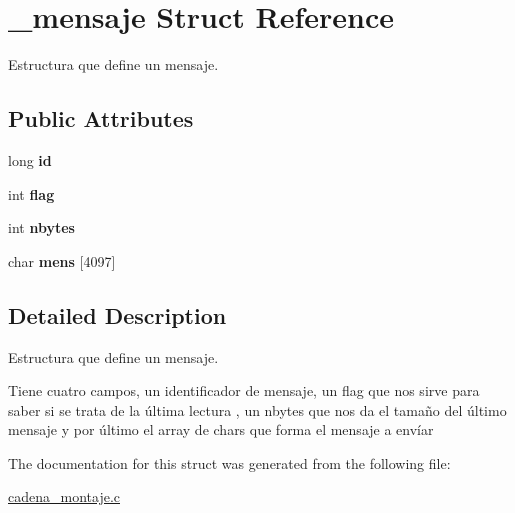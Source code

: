 \hypertarget{struct__mensaje}{}\section{\+\_\+mensaje Struct Reference}
\label{struct__mensaje}


Estructura que define un mensaje.  


\subsection*{Public Attributes}
\begin{DoxyCompactItemize}
\item 
long {\bfseries id}\hypertarget{struct__mensaje_aeaf59644bad62916a92e577483552b6e}{}\label{struct__mensaje_aeaf59644bad62916a92e577483552b6e}

\item 
int {\bfseries flag}\hypertarget{struct__mensaje_ae94d24251661497a0d027421b7df1007}{}\label{struct__mensaje_ae94d24251661497a0d027421b7df1007}

\item 
int {\bfseries nbytes}\hypertarget{struct__mensaje_a6d19a64621430db951be28a04d0fd5ed}{}\label{struct__mensaje_a6d19a64621430db951be28a04d0fd5ed}

\item 
char {\bfseries mens} \mbox{[}4097\mbox{]}\hypertarget{struct__mensaje_a2e0b0e12f865a2ac6c21170e630081a6}{}\label{struct__mensaje_a2e0b0e12f865a2ac6c21170e630081a6}

\end{DoxyCompactItemize}


\subsection{Detailed Description}
Estructura que define un mensaje. 

Tiene cuatro campos, un identificador de mensaje, un flag que nos sirve para saber si se trata de la última lectura , un nbytes que nos da el tamaño del último mensaje y por último el array de chars que forma el mensaje a envíar 

The documentation for this struct was generated from the following file\+:\begin{DoxyCompactItemize}
\item 
\hyperlink{cadena__montaje_8c}{cadena\+\_\+montaje.\+c}\end{DoxyCompactItemize}
